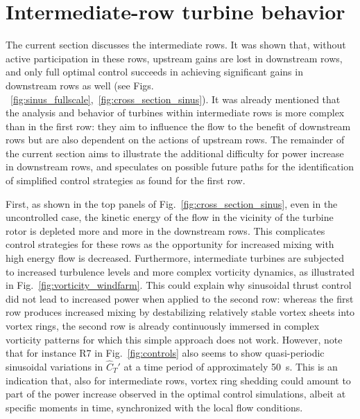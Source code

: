 \documentclass[wes, manuscript]{copernicus}
\newcommand{\cthat}{\widehat{C}_T'}
\begin{document}
\section{Intermediate-row turbine behavior}\label{sec:analysis_intermediate}
The current section discusses the intermediate rows. It was shown that, without active participation in these rows, upstream gains are lost in downstream rows, and only full optimal control succeeds in achieving significant gains in downstream rows as well (see Figs. ~\ref{fig:sinus_fullscale},~\ref{fig:cross_section_sinus}). It was already mentioned that the analysis and behavior of turbines within intermediate rows is more complex than in the first row: they aim to influence the flow to the benefit of downstream rows but are also dependent on the actions of upstream rows. The remainder of the current section aims to illustrate the additional difficulty for power increase in downstream rows, and speculates on possible future paths for the identification of simplified control strategies as found for the first row.

First, as shown in the top panels of Fig.~\ref{fig:cross_section_sinus}, even in the uncontrolled case, the kinetic energy of the flow in the vicinity of the turbine rotor is depleted more and more in the downstream rows. This complicates control strategies for these rows as the opportunity for increased mixing with high energy flow is decreased. Furthermore, intermediate turbines are subjected to increased turbulence levels and more complex vorticity dynamics, as illustrated in Fig.~\ref{fig:vorticity_windfarm}. This could explain why sinusoidal thrust control did not lead to increased power when applied to the second row: whereas the first row produces increased mixing by destabilizing relatively stable vortex sheets into vortex rings, the second row is already continuously immersed in complex vorticity patterns for which this simple approach does not work. 
However, note that for instance R7 in Fig.~\ref{fig:controls} also seems to show quasi-periodic sinusoidal variations in $\cthat$ at a time period of approximately 50~s. This is an indication that, also for intermediate rows, vortex ring shedding could amount to part of the power increase observed in the optimal control simulations, albeit at specific moments in time, synchronized with the local flow conditions.
\end{document}
